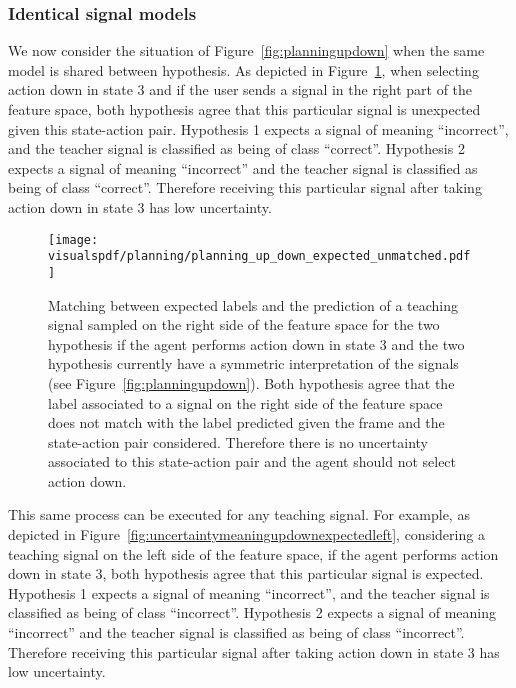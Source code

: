 \subsubsection*{Identical signal models}

We now consider the situation of Figure~\ref{fig:planningupdown} when the same model is shared between hypothesis. As depicted in Figure~\ref{fig:uncertaintymeaningupdownexpectedright}, when selecting action down in state 3 and if the user sends a signal in the right part of the feature space, both hypothesis agree that this particular signal is unexpected given this state-action pair. Hypothesis 1 expects a signal of meaning ``incorrect'', and the teacher signal is classified as being of class ``correct''. Hypothesis 2 expects a signal of meaning ``incorrect'' and the teacher signal is classified as being of class ``correct''. Therefore receiving this particular signal after taking action down in state 3 has low uncertainty.

\begin{figure}[!htbp]
  \centering
  \texttt{[image: \\visualspdf/planning/planning\_up\_down\_expected\_unmatched.pdf]}
  \caption{Matching between expected labels and the prediction of a teaching signal sampled on the right side of the feature space for the two hypothesis if the agent performs action down in state 3 and the two hypothesis currently have a symmetric interpretation of the signals (see Figure~\ref{fig:planningupdown}). Both hypothesis agree that the label associated to a signal on the right side of the feature space does not match with the label predicted given the frame and the state-action pair considered. Therefore there is no uncertainty associated to this state-action pair and the agent should not select action down.}
  \label{fig:uncertaintymeaningupdownexpectedright}
\end{figure}

This same process can be executed for any teaching signal. For example, as depicted in Figure~\ref{fig:uncertaintymeaningupdownexpectedleft}, considering a teaching signal on the left side of the feature space, if the agent performs action down in state 3, both hypothesis agree that this particular signal is expected. Hypothesis 1 expects a signal of meaning ``incorrect'', and the teacher signal is classified as being of class ``incorrect''. Hypothesis 2 expects a signal of meaning ``incorrect'' and the teacher signal is classified as being of class ``incorrect''. Therefore receiving this particular signal after taking action down in state 3 has low uncertainty.

